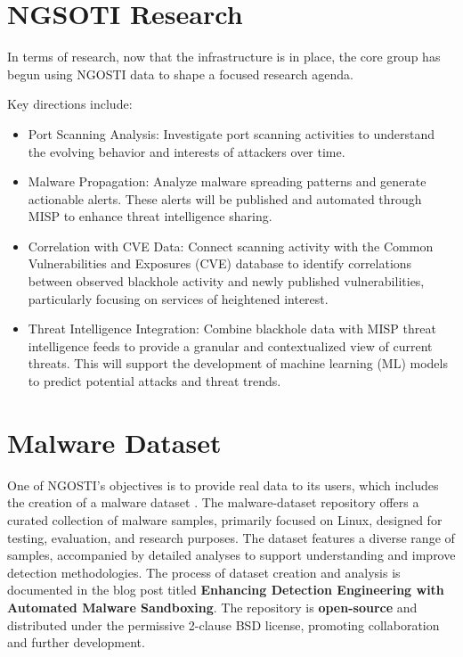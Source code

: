 \section{NGSOTI Research}
In terms of research, now that the infrastructure is in place, the core group
has begun using NGOSTI data to shape a focused research agenda.

Key directions include:

\begin{itemize}
 \item Port Scanning Analysis: Investigate port scanning activities to
 understand the evolving behavior and interests of attackers over time.
 \item Malware Propagation: Analyze malware spreading patterns and
 generate actionable alerts. These alerts will be published and automated
 through MISP to enhance threat intelligence sharing.
 \item Correlation with CVE Data: Connect scanning activity with the
 Common Vulnerabilities and Exposures (CVE) database to identify
 correlations between observed blackhole activity and newly published
 vulnerabilities, particularly focusing on services of heightened interest.
 \item Threat Intelligence Integration: Combine blackhole data with MISP
 threat intelligence feeds to provide a granular and contextualized view
 of current threats. This will support the development of machine
 learning (ML) models to predict potential attacks and threat trends.
 \end{itemize}

\section{Malware Dataset}
One of NGOSTI's objectives is to provide real data to its users, which
includes the creation of a malware dataset \cite{mds}.
The malware-dataset repository
offers a curated collection of malware samples, primarily focused on Linux,
designed for testing, evaluation, and research purposes. The dataset features
a diverse range of samples, accompanied by detailed analyses to support
understanding and improve detection methodologies. The process of dataset
creation and analysis is documented in the blog post titled \textbf{Enhancing
Detection Engineering with Automated Malware Sandboxing}\cite{d4malsand}. The repository is
\textbf{open-source} and distributed under the permissive 2-clause BSD license,
promoting collaboration and further development.



